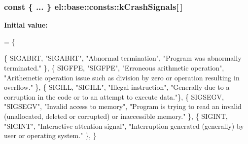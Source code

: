 \subsubsection[{k\+Crash\+Signals}]{\setlength{\rightskip}{0pt plus 5cm}const \{ ... \}   el\+::base\+::consts\+::k\+Crash\+Signals\mbox{[}$\,$\mbox{]}}\label{namespaceel_1_1base_1_1consts_ae148ad63452cb04651a6abe4f6b3f39c}
{\bfseries Initial value\+:}
\begin{DoxyCode}
= \{
        
        \{ SIGABRT, \textcolor{stringliteral}{"SIGABRT"}, \textcolor{stringliteral}{"Abnormal termination"},
                \textcolor{stringliteral}{"Program was abnormally terminated."} \},
        \{ SIGFPE, \textcolor{stringliteral}{"SIGFPE"}, \textcolor{stringliteral}{"Erroneous arithmetic operation"},
                \textcolor{stringliteral}{"Arithemetic operation issue such as division by zero or operation resulting in overflow."} 
      \},
        \{ SIGILL, \textcolor{stringliteral}{"SIGILL"}, \textcolor{stringliteral}{"Illegal instruction"},
                \textcolor{stringliteral}{"Generally due to a corruption in the code or to an attempt to execute data."}\},
        \{ SIGSEGV, \textcolor{stringliteral}{"SIGSEGV"}, \textcolor{stringliteral}{"Invalid access to memory"},
                \textcolor{stringliteral}{"Program is trying to read an invalid (unallocated, deleted or corrupted) or inaccessible
       memory."} \},
        \{ SIGINT, \textcolor{stringliteral}{"SIGINT"}, \textcolor{stringliteral}{"Interactive attention signal"},
                 \textcolor{stringliteral}{"Interruption generated (generally) by user or operating system."} \},
    \}
\end{DoxyCode}
\hypertarget{namespaceel_1_1base_1_1consts_aebf5600a219b9313965789b468416edd}{}
